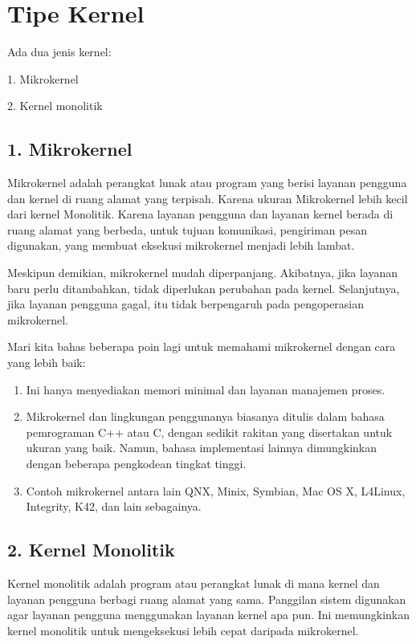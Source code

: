 \documentclass{article}
\begin{document}
	\section*{Tipe Kernel}
	
	Ada dua jenis kernel:
	
	1. Mikrokernel
	
	2. Kernel monolitik
	
	\vskip0.5cm
	
	\subsection*{1. Mikrokernel}
	
	Mikrokernel adalah perangkat lunak atau program yang berisi layanan pengguna dan kernel di ruang alamat yang terpisah. Karena ukuran Mikrokernel lebih kecil dari kernel Monolitik. Karena layanan pengguna dan layanan kernel berada di ruang alamat yang berbeda, untuk tujuan komunikasi, pengiriman pesan digunakan, yang membuat eksekusi mikrokernel menjadi lebih lambat.
	
	Meskipun demikian, mikrokernel mudah diperpanjang. Akibatnya, jika layanan baru perlu ditambahkan, tidak diperlukan perubahan pada kernel. Selanjutnya, jika layanan pengguna gagal, itu tidak berpengaruh pada pengoperasian mikrokernel.
	
	Mari kita bahas beberapa poin lagi untuk memahami mikrokernel dengan cara yang lebih baik: 
	
	\begin{enumerate}
		\item Ini hanya menyediakan memori minimal dan layanan manajemen proses.
		
		\item Mikrokernel dan lingkungan penggunanya biasanya ditulis dalam bahasa pemrograman C++ atau C, dengan sedikit rakitan yang disertakan untuk ukuran yang baik. Namun, bahasa implementasi lainnya dimungkinkan dengan beberapa pengkodean tingkat tinggi.
		
		\item Contoh mikrokernel antara lain QNX, Minix, Symbian, Mac OS X, L4Linux, Integrity, K42, dan lain sebagainya.
	\end{enumerate}

	\vskip0.5cm
	
	\subsection*{2. Kernel Monolitik}
	Kernel monolitik adalah program atau perangkat lunak di mana kernel dan layanan pengguna berbagi ruang alamat yang sama. Panggilan sistem digunakan agar layanan pengguna menggunakan layanan kernel apa pun. Ini memungkinkan kernel monolitik untuk mengeksekusi lebih cepat daripada mikrokernel.
	
\end{document}
